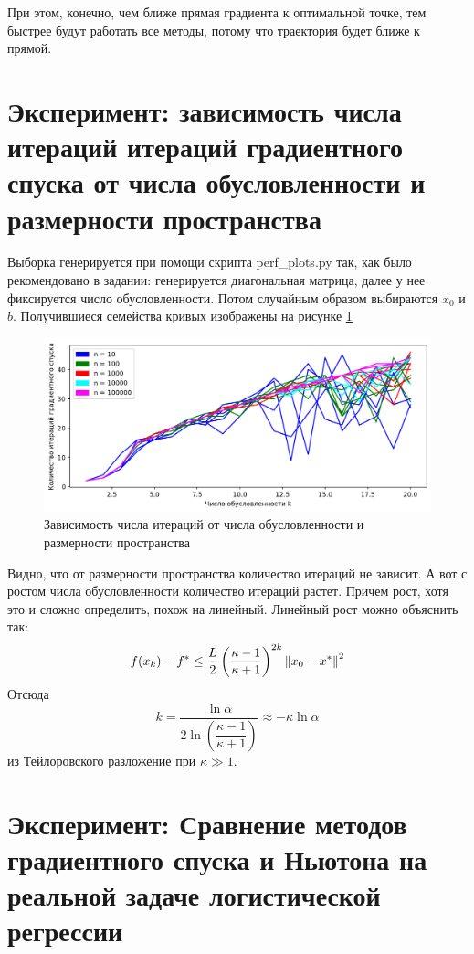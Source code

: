 \documentclass[notitlepage]{article}
\begin{document}
При этом, конечно, чем ближе прямая градиента к оптимальной точке, тем быстрее будут работать все методы, потому что траектория будет
ближе к прямой.

\section*{Эксперимент: зависимость числа итераций итераций градиентного спуска от числа обусловленности и размерности пространства}
Выборка генерируется при помощи скрипта perf\_plots.py так, как было рекомендовано в задании:
генерируется диагональная матрица, далее у нее фиксируется число обусловленности. Потом случайным образом выбираются $x_0$ и $b$.
Получившиеся семейства кривых изображены на рисунке \ref{fig:perfplot}
\begin{figure}[ht]
  \centering
  \includegraphics[width=\linewidth, keepaspectratio]{plots/perf_gradients.png}
  \caption{Зависимость числа итераций от числа обусловленности и размерности пространства}
  \label{fig:perfplot}
\end{figure}

Видно, что от размерности пространства количество итераций не зависит. А вот с ростом числа обусловленности количество
итераций растет. Причем рост, хотя это и сложно определить, похож на линейный. Линейный рост можно объяснить так:
\begin{equation}
  f(x_k) - f^* \leq \frac L2 \left(\frac{\kappa - 1}{\kappa + 1}\right)^{2k} \norm{x_0 - x^*}^2
\end{equation}
Отсюда
\begin{equation}
  k = \frac{\ln\alpha}{2\ln\left(\dfrac{\kappa - 1}{\kappa + 1}\right)} \approx -\kappa\ln\alpha 
\end{equation}
из Тейлоровского разложение при $\kappa \gg 1$.

\section*{Эксперимент: Сравнение методов градиентного спуска и Ньютона на реальной задаче логистической регрессии}
\end{document}
